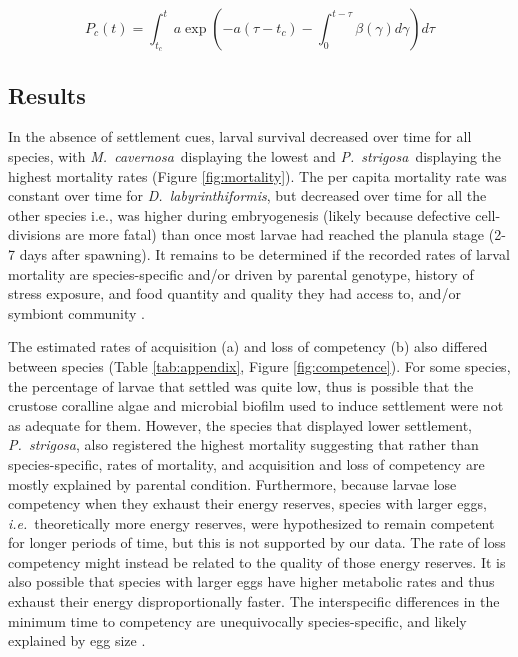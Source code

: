\documentclass[preprint,12pt,authoryear]{elsarticle}
\newcommand{\ie}{{\it i.e.}\ }
\newcommand{\pstr}{{\it P.~strigosa}\ }
\newcommand{\mcav}{{\it M.~cavernosa}\ }
\begin{document}
	\begin{equation}
		P_c(t)=\int_{t_c}^t a\exp\left(-a(\tau-t_c) - \int_0^{t-\tau}\beta(\gamma)d\gamma\right)d\tau
	\end{equation}

	\subsection{Results}
	In the absence of settlement cues, larval survival decreased over time for all species, with \mcav displaying the lowest and \pstr displaying the highest mortality rates (Figure \ref{fig:mortality}). The per capita mortality rate was constant over time for \textit{D.~labyrinthiformis}, but decreased over time for all the other species i.e., was higher during embryogenesis (likely because defective cell-divisions are more fatal) than once most larvae had reached the planula stage (2-7 days after spawning). It remains to be determined if the recorded rates of larval mortality are species-specific and/or driven by parental genotype, history of stress exposure, and food quantity and quality they had access to, and/or symbiont community \citep{jones2011tradeoffs, baums2013genotypic,padilla2013all,kirk2018genomic}.

	The estimated rates of acquisition (a) and loss of competency (b) also differed between species (Table \ref{tab:appendix}, Figure \ref{fig:competence}). For some species, the percentage of larvae that settled was quite low, thus is possible that the crustose coralline algae and microbial biofilm used to induce settlement were not as adequate for them. However, the species that displayed lower settlement, \textit{P.~strigosa}, also registered the highest mortality suggesting that rather than species-specific, rates of mortality, and acquisition and loss of competency are mostly explained by parental condition. Furthermore, because larvae lose competency when they exhaust their energy reserves, species with larger eggs, \ie theoretically more energy reserves, were hypothesized to remain competent for longer periods of time, but this is not supported by our data. The rate of loss competency might instead be related to the quality of those energy reserves. It is also possible that species with larger eggs have higher metabolic rates and thus exhaust their energy disproportionally faster. The interspecific differences in the minimum time to competency are unequivocally species-specific, and likely explained by egg size \citep{figueiredo2025predicting}.
%
\end{document}
